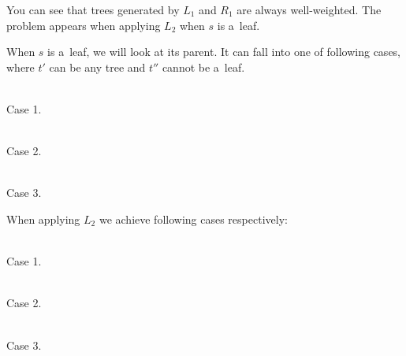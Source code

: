\documentclass[final]{article}
\theoremstyle{definition}
\theoremstyle{definition}
\theoremstyle{remark}
\begin{document}
You can see that trees generated by \(L_1\) and \(R_1\) are always well-weighted. The problem appears when applying \(L_2\) when \(s\) is a~leaf.

When \(s\) is a~leaf, we will look at its parent. It can fall into one of following cases, where \(t'\) can be any tree and \(t''\) cannot be a~leaf.

\begin{center}
    \begin{minipage}[t]{.3\textwidth}
        \begin{center}
            \\
            Case 1.
        \end{center}
    \end{minipage}%
    \begin{minipage}[t]{.3\textwidth}
        \begin{center}
            \\
            Case 2.
        \end{center}
    \end{minipage}%
    \begin{minipage}[t]{.3\textwidth}
        \begin{center}
            \\
            Case 3.
        \end{center}
    \end{minipage}%
\end{center}

When applying \(L_2\) we achieve following cases respectively:

\begin{center}
    \begin{minipage}[t]{.3\textwidth}
        \begin{center}
            \\
            Case 1.
        \end{center}
    \end{minipage}%
    \begin{minipage}[t]{.3\textwidth}
        \begin{center}
            \\
            Case 2.
        \end{center}
    \end{minipage}%
    \begin{minipage}[t]{.3\textwidth}
        \begin{center}
            \\
            Case 3.
        \end{center}
    \end{minipage}%
\end{center}
\end{document}
